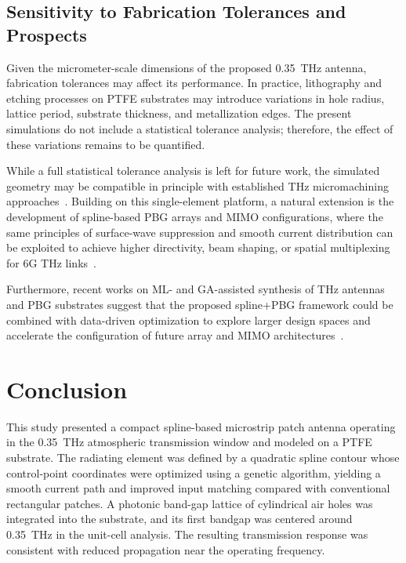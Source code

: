 \documentclass[USenglish]{article}
\begin{document}
\subsection{Sensitivity to Fabrication Tolerances and Prospects}
\label{subsec:tolerances}

Given the micrometer-scale dimensions of the proposed 0.35~THz antenna, fabrication tolerances may affect its performance. In practice, lithography and etching processes on PTFE substrates may introduce variations in hole radius, lattice period, substrate thickness, and metallization edges. The present simulations do not include a statistical tolerance analysis; therefore, the effect of these variations remains to be quantified.

While a full statistical tolerance analysis is left for future work, the simulated geometry may be compatible in principle with established THz micromachining approaches~\cite{he_overview_2020,hajiyat_antenna_2021}. Building on this single-element platform, a natural extension is the development of spline-based PBG arrays and MIMO configurations, where the same principles of surface-wave suppression and smooth current distribution can be exploited to achieve higher directivity, beam shaping, or spatial multiplexing for 6G THz links~\cite{nirob_grid_2025,mousa_ebg_2026}.

Furthermore, recent works on ML- and GA-assisted synthesis of THz antennas and PBG substrates suggest that the proposed spline+PBG framework could be combined with data-driven optimization to explore larger design spaces and accelerate the configuration of future array and MIMO architectures~\cite{babaahmed_hybrid_2025,merino_machine_2025}.




\section{Conclusion}
\label{sec:conclusion}

This study presented a compact spline-based microstrip patch antenna operating in the 0.35~THz atmospheric transmission window and modeled on a PTFE substrate. The radiating element was defined by a quadratic spline contour whose control-point coordinates were optimized using a genetic algorithm, yielding a smooth current path and improved input matching compared with conventional rectangular patches. A photonic band-gap lattice of cylindrical air holes was integrated into the substrate, and its first bandgap was centered around 0.35~THz in the unit-cell analysis. The resulting transmission response was consistent with reduced propagation near the operating frequency.
\end{document}
